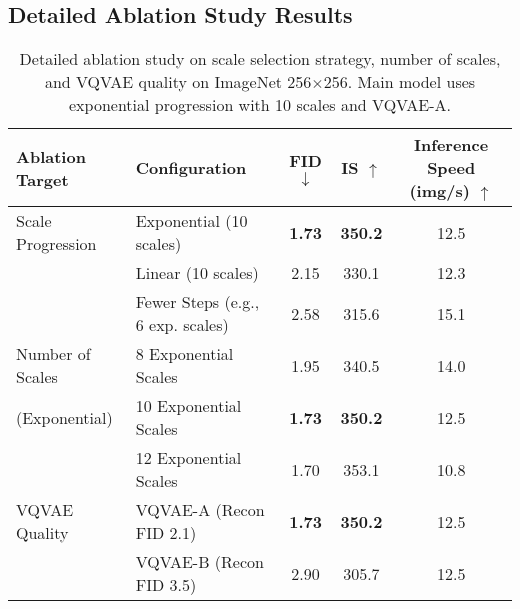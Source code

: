 \documentclass{article}
\begin{document}
\subsection{Detailed Ablation Study Results}
\begin{table}[h!]
\centering
\caption{Detailed ablation study on scale selection strategy, number of scales, and VQVAE quality on ImageNet 256$\times$256. Main model uses exponential progression with 10 scales and VQVAE-A.}
\label{app_tab:ablation_details}
\begin{tabular}{llccc}
\toprule
Ablation Target & Configuration & FID $\downarrow$ & IS $\uparrow$ & Inference Speed (img/s) $\uparrow$ \\
\midrule
Scale Progression & Exponential (10 scales) & \textbf{1.73} & \textbf{350.2} & 12.5 \\
                  & Linear (10 scales)      & 2.15 & 330.1 & 12.3 \\
                  & Fewer Steps (e.g., 6 exp. scales) & 2.58 & 315.6 & 15.1 \\
\midrule
Number of Scales  & 8 Exponential Scales    & 1.95 & 340.5 & 14.0 \\
(Exponential)     & 10 Exponential Scales   & \textbf{1.73} & \textbf{350.2} & 12.5 \\
                  & 12 Exponential Scales   & 1.70 & 353.1 & 10.8 \\
\midrule
VQVAE Quality     & VQVAE-A (Recon FID 2.1) & \textbf{1.73} & \textbf{350.2} & 12.5 \\
                  & VQVAE-B (Recon FID 3.5) & 2.90 & 305.7 & 12.5 \\
\bottomrule
\end{tabular}
\end{table}

\end{document}
